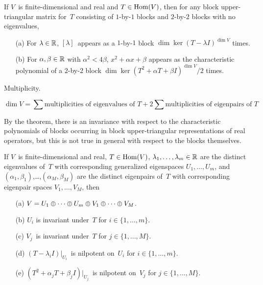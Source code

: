 \begin{thm}
If \(V\)~is finite-dimensional and real and \(T\in\operatorname{Hom}(V)\), then for any block upper-triangular matrix for~\(T\) consisting of \(1\)-by-\(1\) blocks and \(2\)-by-\(2\) blocks with no eigenvalues,
\begin{enumerate}[itemsep=0pt]
\item[(a)] For \(\lambda\in\mathbb{R}\), \([\lambda]\)~appears as a \(1\)-by-\(1\) block \(\dim\ker(T-\lambda I)^{\dim V}\) times.
\item[(b)] For \(\alpha,\beta\in\mathbb{R}\) with \(\alpha^2<4\beta\), \(x^2+\alpha x+\beta\) appears as the characteristic polynomial of a \(2\)-by-\(2\) block \(\dim\ker(T^2+\alpha T+\beta I)^{\dim V}/2\) times.
\end{enumerate}
\end{thm}
\begin{app}
Multiplicity.
\end{app}
\begin{cor}
\[\dim V=\sum\text{multiplicities of eigenvalues of~\(T\)}+2\sum\text{multiplicities of eigenpairs of~\(T\)}\]
\end{cor}
\begin{rmk}
By the theorem, there is an invariance with respect to the characteristic polynomials of blocks occurring in block upper-triangular representations of real operators, but this is not true in general with respect to the blocks themselves.
\end{rmk}

\begin{thm} 
If \(V\)~is finite-dimensional and real, \(T\in\operatorname{Hom}(V)\), \(\lambda_1,\ldots,\lambda_m\in\mathbb{R}\) are the distinct eigenvalues of~\(T\) with corresponding generalized eigenspaces \(U_1,\ldots,U_m\), and \((\alpha_1,\beta_1)\),\ldots,\((\alpha_M,\beta_M)\) are the distinct eigenpairs of~\(T\) with corresponding eigenpair spaces \(V_1,\ldots,V_M\), then
\begin{enumerate}[itemsep=0pt]
\item[(a)] \(V=U_1\oplus\cdots\oplus U_m\oplus V_1\oplus\cdots\oplus V_M\).
\item[(b)] \(U_i\) is invariant under~\(T\) for \(i\in\{1,\ldots,m\}\).
\item[(c)] \(V_j\)~is invariant under~\(T\) for \(j\in\{1,\ldots,M\}\).
\item[(d)] \((T-\lambda_i I)|_{U_i}\)~is nilpotent on~\(U_i\) for \(i\in\{1,\ldots,m\}\).
\item[(e)] \((T^2+\alpha_jT+\beta_j I)|_{U_j}\)~is nilpotent on~\(V_j\) for \(j\in\{1,\ldots,M\}\).
\end{enumerate}
\end{thm}

